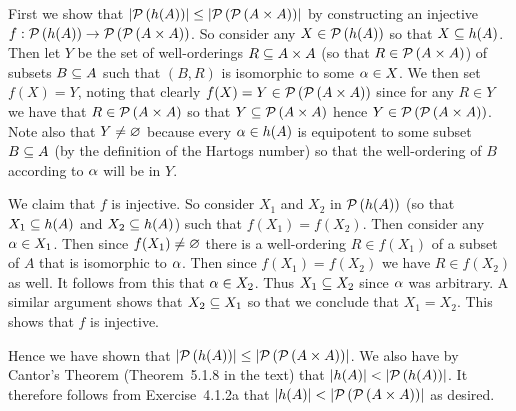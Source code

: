 \begin{solution}
    \def\pha{\pset{h(A)}}
    \def\paa{\pset{\pset{A \times A}}}
	First we show that $\abs{\pha} \leq \abs{\paa}$ by constructing an injective $f : \pha \to \paa$.
    So consider any $X \in \pha$ so that $X \ss h(A)$.
    Then let $Y$ be the set of well-orderings $R \ss A \times A$ (so that $R \in \pset{A \times A}$) of subsets $B \ss A$ such that $(B,R)$ is isomorphic to some $\a \in X$.
    We then set $f(X) = Y$, noting that clearly $f(X) = Y \in \paa$ since for any $R \in Y$ we have that $R \in \pset{A \times A}$ so that $Y \ss \pset{A \times A}$ hence $Y \in \paa$.
    Note also that $Y \neq \es$ because every $\a \in h(A)$ is equipotent to some subset $B \ss A$ (by the definition of the Hartogs number) so that the well-ordering of $B$ according to $\a$ will be in $Y$.

    We claim that $f$ is injective.
    So consider $X_1$ and $X_2$ in $\pha$ (so that $X_1 \ss h(A)$ and $X_2 \ss h(A)$) such that $f(X_1) = f(X_2)$.
    Then consider any $\a \in X_1$.
    Then since $f(X_1) \neq \es$ there is a well-ordering $R \in f(X_1)$ of a subset of $A$ that is isomorphic to $\a$.
    Then since $f(X_1) = f(X_2)$ we have $R \in f(X_2)$ as well.
    It follows from this that $\a \in X_2$.
    Thus $X_1 \ss X_2$ since $\a$ was arbitrary.
    A similar argument shows that $X_2 \ss X_1$ so that we conclude that $X_1 = X_2$.
    This shows that $f$ is injective.

    Hence we have shown that $\abs{\pha} \leq \abs{\paa}$.
    We also have by Cantor's Theorem (Theorem~5.1.8 in the text) that $\abs{h(A)} < \abs{\pha}$.
    It therefore follows from Exercise~4.1.2a that $\abs{h(A)} < \abs{\paa}$ as desired. \qedsymbol
\end{solution}

